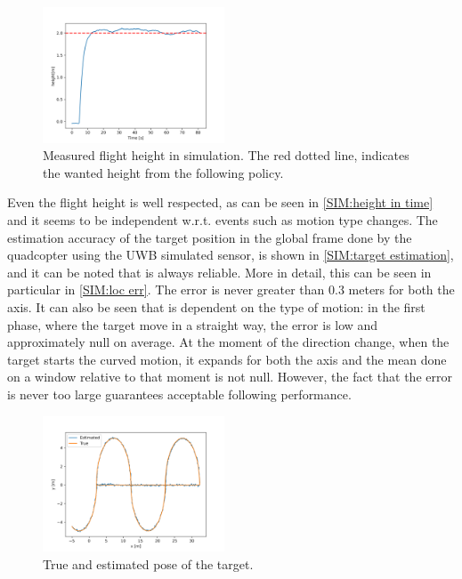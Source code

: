 \begin{figure}
    \centering
    \includegraphics[width=0.48\textwidth]{images/Simulation/height_from_px4.png}
    \caption{Measured flight height in simulation. The red dotted line, indicates the wanted height from the following policy.}
    \label{SIM:height in time}
\end{figure}

Even the flight height is well respected, as can be seen in \autoref{SIM:height in time} and it seems to be independent w.r.t. events such as motion type changes. 
The estimation accuracy of the target position in the global frame done by the quadcopter using the UWB simulated sensor, is shown in \autoref{SIM:target estimation}, and it can be noted that is always reliable. More in detail, this can be seen in particular in \autoref{SIM:loc err}. The error is never greater than $0.3$ meters for both the axis. It can also be seen that is dependent on the type of motion: in the first phase, where the target move in a straight way, the error is low and approximately null on average. At the moment of the direction change, when the target starts the curved motion, it expands for both the axis and the mean done on a window relative to that moment is not null. However, the fact that the error is never too large guarantees acceptable following performance.\\

\begin{figure}
    \centering
    \includegraphics[width=0.48\textwidth]{images/Simulation/tag_estimation_vs_real.png}
    \caption{True and estimated pose of the target.}
    \label{SIM:target estimation}
\end{figure}

